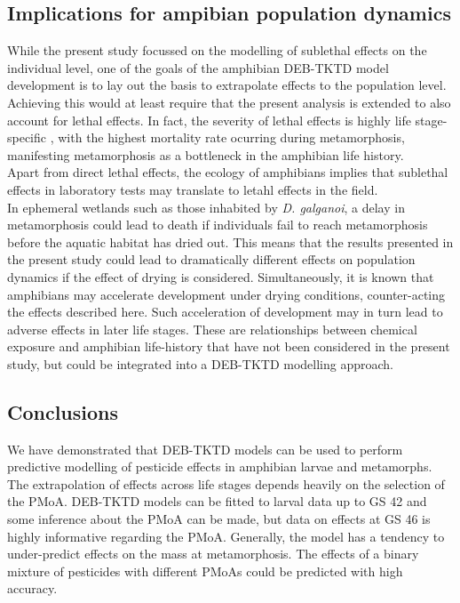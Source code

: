 \documentclass[utf8]{FrontiersinHarvard} %
\begin{document}
\subsection{Implications for ampibian population dynamics}
\noindent
While the present study focussed on the modelling of sublethal effects on the individual level, 
one of the goals of the amphibian DEB-TKTD model development is to lay out the basis to extrapolate effects to the population level.
Achieving this would at least require that the present analysis is extended to also account for lethal effects. 
In fact, the severity of lethal effects is highly life stage-specific \citep{gonzalez-lopezChronicExposurePesticides2026}, 
with the highest mortality rate ocurring during metamorphosis, 
manifesting metamorphosis as a bottleneck in the amphibian life history.\\ 
Apart from direct lethal effects, the ecology of amphibians implies that sublethal effects in laboratory tests 
may translate to letahl effects in the field.\\
In ephemeral wetlands such as those inhabited by \textit{D. galganoi},
a delay in metamorphosis could lead to death if individuals fail to reach metamorphosis 
before the aquatic habitat has dried out. 
This means that the results presented in the present study could lead 
to dramatically different effects on population dynamics if the effect of drying is considered. 
Simultaneously, it is known that amphibians may accelerate development under drying conditions, 
counter-acting the effects described here. 
Such acceleration of development may in turn lead to adverse effects in later life stages. 
These are relationships between chemical exposure and amphibian life-history that have not been considered 
in the present study, but could be integrated into a DEB-TKTD modelling approach.
%
\subsection{Conclusions}
\noindent 
We have demonstrated that DEB-TKTD models can be used to perform predictive modelling 
of pesticide effects in amphibian larvae and metamorphs.
The extrapolation of effects across life stages depends heavily on the selection of the PMoA. 
DEB-TKTD models can be fitted to larval data up to GS 42 and some inference about the PMoA can be made, 
but data on effects at GS 46 is highly informative regarding the PMoA.
Generally, the model has a tendency to under-predict effects on the mass at metamorphosis. 
The effects of a binary mixture of pesticides with different PMoAs could be predicted with high accuracy.
\end{document}
